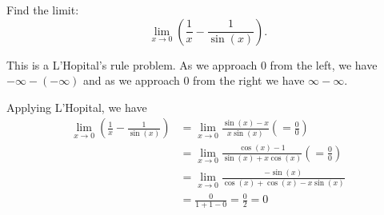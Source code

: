 \documentclass{ximera}
\author{Emma Smith Zbarsky}
\begin{document}
\begin{exercise}

Find the limit: \[\lim_{x \to 0} \left(\frac{1}{x} - \frac{1}{\sin(x)}\right).\]


\begin{hint}
This is a L'Hopital's rule problem. As we approach 0 from the left, we
have $-\infty - (-\infty)$ and as we approach 0 from the right we have
$\infty-\infty$.
\end{hint}


\begin{hint}
Applying L'Hopital, we have \begin{align*}
\lim_{x\to 0} \left(\frac{1}{x} - \frac{1}{\sin(x)} \right)&= \lim_{x\to 0} \frac{\sin(x)-x}{x\sin(x)} \left(=\frac{0}{0}\right) \\
&= \lim_{x\to 0} \frac{\cos(x)-1}{\sin(x)+x\cos(x)} \left(=\frac{0}{0}\right) \\
&= \lim_{x\to 0} \frac{-\sin(x)}{\cos(x)+\cos(x)-x\sin(x)} \\
&= \frac{0}{1+1-0} = \frac{0}{2} = 0
\end{align*}
\end{hint}


\begin{multipleChoice}
\choice{$-\infty$}
\choice{$\infty$}
\end{multipleChoice}

\end{exercise}
\end{document}

